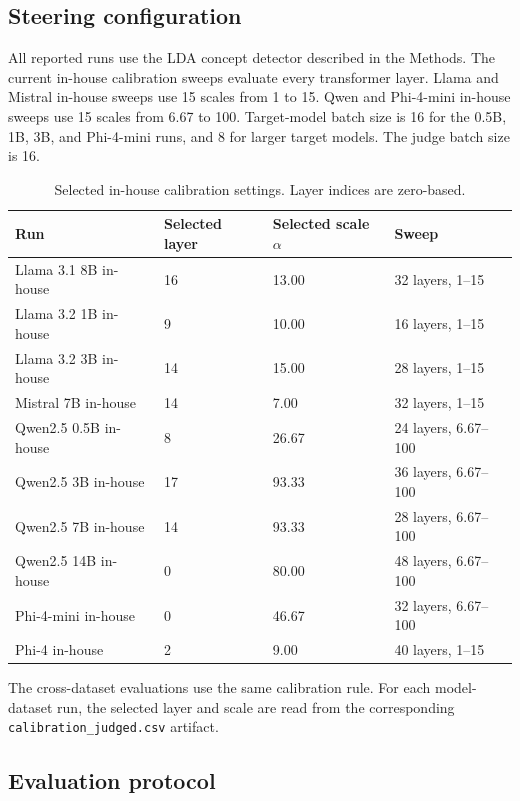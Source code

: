 \documentclass{article}
\begin{document}
\subsection{Steering configuration}

All reported runs use the LDA concept detector described in the Methods. The
current in-house calibration sweeps evaluate every transformer layer. Llama and
Mistral in-house sweeps use 15 scales from 1 to 15. Qwen and Phi-4-mini
in-house sweeps use 15 scales from 6.67 to 100. Target-model batch size is 16
for the 0.5B, 1B, 3B, and Phi-4-mini runs, and 8 for larger target models. The
judge batch size is 16.

\begin{table}[h]
\centering
\small
\begin{tabular}{llll}
\hline
Run & Selected layer & Selected scale $\alpha$ & Sweep \\
\hline
Llama 3.1 8B in-house & 16 & 13.00 & 32 layers, 1--15 \\
Llama 3.2 1B in-house & 9 & 10.00 & 16 layers, 1--15 \\
Llama 3.2 3B in-house & 14 & 15.00 & 28 layers, 1--15 \\
Mistral 7B in-house & 14 & 7.00 & 32 layers, 1--15 \\
Qwen2.5 0.5B in-house & 8 & 26.67 & 24 layers, 6.67--100 \\
Qwen2.5 3B in-house & 17 & 93.33 & 36 layers, 6.67--100 \\
Qwen2.5 7B in-house & 14 & 93.33 & 28 layers, 6.67--100 \\
Qwen2.5 14B in-house & 0 & 80.00 & 48 layers, 6.67--100 \\
Phi-4-mini in-house & 0 & 46.67 & 32 layers, 6.67--100 \\
Phi-4 in-house & 2 & 9.00 & 40 layers, 1--15 \\
\hline
\end{tabular}
\caption{Selected in-house calibration settings. Layer indices are zero-based.}
\label{tab:appendix-inhouse-calibration}
\end{table}

The cross-dataset evaluations use the same calibration rule. For each
model-dataset run, the selected layer and scale are read from the corresponding
\texttt{calibration\_judged.csv} artifact.

\subsection{Evaluation protocol}
\end{document}
